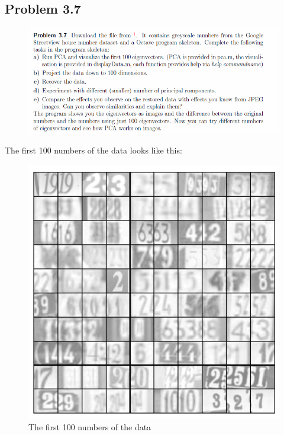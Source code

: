\subsection{Problem 3.7}

\begin{figure}[!ht]
\includegraphics[width=1\textwidth]{chapters/images/desc-3-7}
\end{figure}

The first 100 numbers of the data looks like this:

\newpage

\begin{figure}[!ht]
\includegraphics[width=1\textwidth]{chapters/images/figure-3-7-a}
\caption{The first 100 numbers of the data}
\end{figure}


